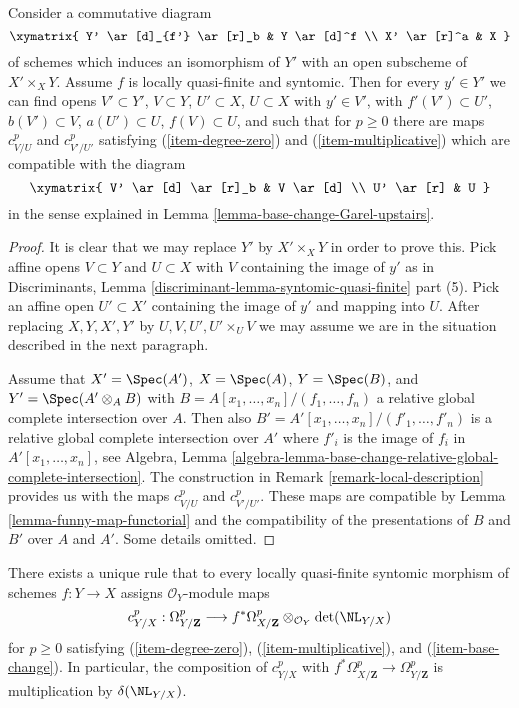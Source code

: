 \begin{lemma}
\label{lemma-existence-base-change-Garel-upstairs}
Consider a commutative diagram
$$
\xymatrix{
Y' \ar[d]_{f'} \ar[r]_b & Y \ar[d]^f \\
X' \ar[r]^a & X
}
$$
of schemes which induces an isomorphism of $Y'$ with an open subscheme of
$X' \times_X Y$. Assume $f$ is locally quasi-finite and syntomic. Then for
every $y' \in Y'$ we can find opens $V' \subset Y'$,
$V \subset Y$, $U' \subset X$, $U \subset X$ with $y' \in V'$, with
$f'(V') \subset U'$, $b(V') \subset V$, $a(U') \subset U$,
$f(V) \subset U$, and such that for $p \geq 0$ there are maps
$c^p_{V/U}$ and $c^p_{V'/U'}$ satisfying (\ref{item-degree-zero})
and (\ref{item-multiplicative}) which are compatible with the diagram
$$
\xymatrix{
V' \ar[d] \ar[r]_b & V \ar[d] \\
U' \ar[r] & U
}
$$
in the sense explained in Lemma \ref{lemma-base-change-Garel-upstairs}.
\end{lemma}

\begin{proof}
It is clear that we may replace $Y'$ by $X' \times_X Y$ in order to prove this.
Pick affine opens $V \subset Y$ and $U \subset X$ with $V$ containing
the image of $y'$ as in
Discriminants, Lemma \ref{discriminant-lemma-syntomic-quasi-finite} part (5).
Pick an affine open $U' \subset X'$ containing the image of $y'$
and mapping into $U$. After replacing $X, Y, X', Y'$ by
$U, V, U', U' \times_U V$ we may assume we are in the situation
described in the next paragraph.

\medskip\noindent
Assume that $X' = \Spec(A')$, $X = \Spec(A)$, $Y = \Spec(B)$, and
$Y' = \Spec(A' \otimes_A B)$ with $B = A[x_1, \ldots, x_n]/(f_1, \ldots, f_n)$
a relative global complete intersection over $A$. Then also
$B' = A'[x_1, \ldots, x_n]/(f'_1, \ldots, f'_n)$ is a relative
global complete intersection over $A'$ where $f'_i$ is the image of $f_i$
in $A'[x_1, \ldots, x_n]$, see Algebra, Lemma
\ref{algebra-lemma-base-change-relative-global-complete-intersection}.
The construction in Remark \ref{remark-local-description}
provides us with the maps $c^p_{V/U}$ and $c^p_{V'/U'}$.
These maps are compatible by Lemma \ref{lemma-funny-map-functorial}
and the compatibility of the presentations of $B$ and $B'$ over
$A$ and $A'$. Some details omitted.
\end{proof}

\begin{lemma}
\label{lemma-Garel-upstairs}
There exists a unique rule that to every locally quasi-finite syntomic
morphism of schemes $f : Y \to X$ assigns $\mathcal{O}_Y$-module maps
$$
c^p_{Y/X} :
\Omega^p_{Y/\mathbf{Z}}
\longrightarrow
f^*\Omega^p_{X/\mathbf{Z}} \otimes_{\mathcal{O}_Y} \det(\NL_{Y/X})
$$
for $p \geq 0$ satisfying (\ref{item-degree-zero}), (\ref{item-multiplicative}),
and (\ref{item-base-change}). In particular, the composition of
$c^p_{Y/X}$ with $f^*\Omega^p_{X/\mathbf{Z}} \to \Omega^p_{Y/\mathbf{Z}}$
is multiplication by $\delta(\NL_{Y/X})$.
\end{lemma}

